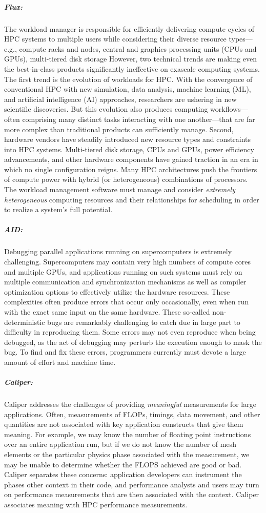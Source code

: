 \subparagraph{Flux:}
The workload manager is responsible for efficiently
delivering compute cycles of HPC systems to multiple users while considering their
diverse resource types---e.g., compute racks and nodes, central and graphics
processing units (CPUs and GPUs), multi-tiered disk storage
However, two technical trends are making even the best-in-class
products significantly ineffective on exascale computing systems.
The first trend is the evolution of workloads for HPC. With the convergence
of conventional HPC with new simulation, data analysis, machine learning (ML),
and artificial intelligence (AI) approaches, researchers are ushering in
new scientific discoveries. But this evolution also produces computing
workflows---often comprising many distinct tasks interacting with one
another---that are far more complex than traditional products
can sufficiently manage.
Second, hardware vendors have steadily introduced
new resource types and constraints into HPC systems.
Multi-tiered disk storage, CPUs and GPUs,
power efficiency advancements, and other hardware components have gained
traction in an era in which no single configuration reigns. Many HPC
architectures push the frontiers of compute power with hybrid (or
heterogeneous) combinations of processors.
The workload management software must manage and consider {\em extremely heterogeneous} computing
resources and their relationships for scheduling in order to realize a
system's full potential.


\subparagraph{AID:}
Debugging parallel applications running on supercomputers is extremely
challenging.  Supercomputers may contain very high
numbers of compute cores and multiple GPUs, and applications running on
such systems must rely on multiple communication and synchronization
mechanisms as well as compiler optimization options to effectively
utilize the hardware resources. These complexities often produce errors
that occur only occasionally, even when run with the exact same input on
the same hardware. These so-called non-deterministic bugs are remarkably
challenging to catch due in large part to difficulty in reproducing
them. Some errors may not even reproduce when being debugged, as the act
of debugging may perturb the execution enough to mask the bug.  To find
and fix these errors, programmers currently must devote a large amount of
effort and machine time.

\subparagraph{Caliper:}
Caliper addresses the challenges of providing {\it meaningful}
measurements for large applications.  Often, measurements of FLOPs,
timings, data movement, and other quantities are not associated with key
application constructs that give them meaning.  For example, we may know
the number of floating point instructions over an entire application run,
but if we do not know the number of mesh elements or the particular
physics phase associated with the measurement, we may be unable to
determine whether the FLOPS achieved are good or bad.  Caliper separates
these concerns: application developers can instrument the phases other
context in their code, and performance analysts and users may turn on
performance measurements that are then associated with the context.
Caliper associates meaning with HPC performance measurements.



